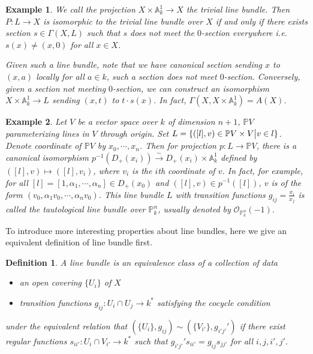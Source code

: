 \documentclass{ctexart}
\newtheorem{definition}{Definition}[section]
\newtheorem{example}{Example}[section]
\begin{document}
\begin{example}
    We call the projection $X \times \mathbb{A}_{k}^{1} \rightarrow X$ the trivial line bundle.
    Then $P: L \rightarrow X$ is isomorphic to the trivial line bundle over $X$ if and only if there exists section $s\in \Gamma(X, L)$ such that $s$ does not meet the $0$-section everywhere i.e. $s(x) \neq (x, 0)$ for all $x\in X$.
    \par
    Given such a line bundle, note that we have canonical section sending $x$ to $(x, a)$ locally for all $a\in k$,
    such a section does not meet $0$-section.
    Conversely, given a section not meeting $0$-section,
    we can construct an isomorphism $X \times \mathbb{A}_{k}^{1} \rightarrow L$ sending $(x, t)$ to $t \cdot s(x)$.
    In fact, $\Gamma(X, X \times \mathbb{A}_{k}^{1}) = A(X)$.
\end{example}
\begin{example}
    Let $V$ be a vector space over $k$ of dimension $n + 1$, $\mathbb{P}V$ parameterizing lines in $V$ through origin.
    Set $L = \{([l], v)\in \mathbb{P}V \times V \big{|} v\in l\}$.
    Denote coordinate of $\mathbb{P}V$ by $x_{0}, \cdots, x_{n}$.
    Then for projection $p: L \rightarrow \mathbb{P}V$, there is a canonical isomorphism $p^{-1}(D_{+}(x_{i})) \overset{\sim}{\rightarrow} D_{+}(x_{i}) \times \mathbb{A}_{k}^{1}$ defined by $([l], v) \mapsto ([l], v_{i})$,
    where $v_{i}$ is the $i$th coordinate of $v$.
    In fact, for example, for all $[l] = [1, \alpha_{1}, \cdots, \alpha_{n}]\in D_{+}(x_{0})$ and $([l], v)\in p^{-1}([l])$,
    $v$ is of the form $(v_{0}, \alpha_{1}v_{0}, \cdots, \alpha_{n}v_{0})$.
    This line bundle $L$ with transition functions $g_{ij} = \frac{x_{i}}{x_{j}}$ is called the tautological line bundle over $\mathbb{P}_{k}^{n}$, usually denoted by $\mathcal{O}_{\mathbb{P}_{k}^{n}}(-1)$.
\end{example}
To introduce more interesting properties about line bundles,
here we give an equivalent definition of line bundle first.
\begin{definition}
    A line bundle is an equivalence class of a collection of data 
    \begin{itemize}
        \item an open covering $\{U_{i}\}$ of $X$
        \item transition functions $g_{ij}: U_{i} \cap U_{j} \rightarrow k^{\ast}$ satisfying the cocycle condition
    \end{itemize}
    under the equivalent relation that $(\{U_{i}\}, g_{ij}) \sim (\{V_{i'}\}, g_{i'j'}')$ if there exist regular functions $s_{ii'}: U_{i} \cap V_{i'} \rightarrow k^{\ast}$ such that $g_{i'j'}'s_{ii'} = g_{ij}s_{jj'}$ for all $i, j, i', j'$.
\end{definition}
\end{document}
